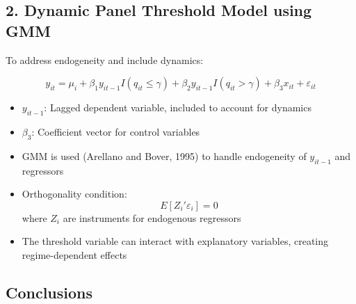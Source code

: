 \documentclass[10pt, oneside]{article}
\begin{document}
\subsection*{2. Dynamic Panel Threshold Model using GMM}

To address endogeneity and include dynamics:

\begin{equation}
	y_{it} = \mu_i + \beta_1 y_{it-1} I(q_{it} \leq \gamma) + \beta_2 y_{it-1} I(q_{it} > \gamma) + \beta_3 x_{it} + \varepsilon_{it}
\end{equation}

\begin{itemize}
	\item $y_{it-1}$: Lagged dependent variable, included to account for dynamics
	\item $\beta_3$: Coefficient vector for control variables
	\item GMM is used (Arellano and Bover, 1995) to handle endogeneity of $y_{it-1}$ and regressors
	\item Orthogonality condition:
	      \begin{equation}
		      E[Z_i' \varepsilon_i] = 0
	      \end{equation}
	      where $Z_i$ are instruments for endogenous regressors
	\item The threshold variable can interact with explanatory variables, creating regime-dependent effects
\end{itemize}
\subsection{Conclusions}
\end{document}
